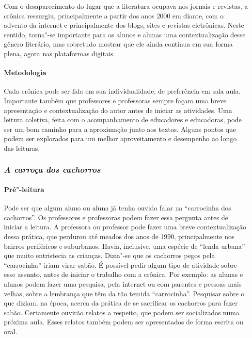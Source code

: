 \documentclass[11pt]{extarticle}
\begin{document}
Com o desaparecimento do lugar que a literatura ocupava nos jornais e
revistas, a crônica ressurgiu, principalmente a partir dos anos 2000 em
diante, com o advento da internet e principalmente dos blogs, sites e
revistas eletrônicas. Neste sentido, torna"-se importante para os alunos
e alunas uma contextualização desse gênero literário, mas sobretudo
mostrar que ele ainda continua em sua forma plena, agora nas plataformas
digitais.


\paragraph{Metodologia} Cada crônica pode ser lida em sua individualidade,
de preferência em sala aula. Importante também que professores e professoras 
sempre façam uma breve apresentação e contextualização do
autor antes de iniciar as atividades. Uma leitura coletiva, feita com o
acompanhamento de educadores e educadoras, pode ser um bom caminho para
a aproximação junto aos textos. Alguns pontos que podem ser explorados
para um melhor aproveitamento e desempenho ao longo das leituras.

\subsubsection{\textit{A carroça dos cachorros}}

\paragraph{Pré"-leitura}

Pode ser que algum aluno ou aluna já tenha ouvido falar na
``carrocinha dos cachorros''. Os professores e professoras podem fazer
essa pergunta antes de iniciar a leitura. A professora ou professor pode
fazer uma breve contextualização dessa prática, que perdurou até meados
dos anos de 1990, principalmente nos bairros periféricos e suburbanos.
Havia, inclusive, uma espécie de ``lenda urbana'' que muito entristecia
as crianças. Dizia"-se que os cachorros pegos pela ``carrocinha'' iriam
virar sabão. É possível pedir algum tipo de atividade sobre esse
assunto, antes de iniciar o trabalho com a crônica. Por exemplo: as
alunas e alunos podem fazer uma pesquisa, pela internet ou com parentes
e pessoas mais velhas, sobre a lembrança que têm da tão temida
``carrocinha''. Pesquisar sobre o que diziam, na época, acerca da
prática de se sacrificar os cachorros para fazer sabão. Certamente
ouvirão relatos a respeito, que podem ser socializados numa próxima
aula. Esses relatos também podem ser apresentados de forma escrita ou
oral.
\end{document}
